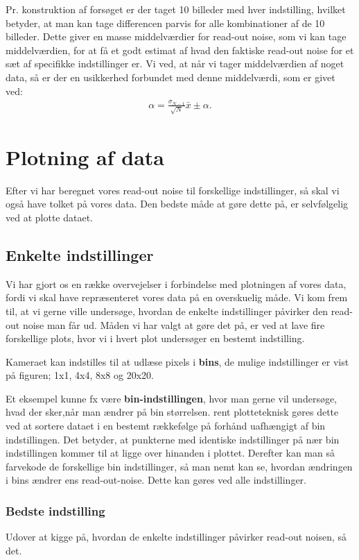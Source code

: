 \documentclass[working]{tuftebook}
\begin{document}
Pr. konstruktion af forsøget er der taget 10 billeder med hver indstilling, hvilket betyder, at man kan tage differencen parvis for alle kombinationer af de 10 billeder. Dette giver en masse middelværdier for read-out noise, som vi kan tage middelværdien, for at få et godt estimat af hvad den faktiske read-out noise for et sæt af specifikke indstillinger er. Vi ved, at når vi tager middelværdien af noget data, så er der en usikkerhed forbundet med denne middelværdi, som er givet ved:
\begin{align*}
\alpha = \frac{\sigma_{N-1}}{\sqrt{N}}
\bar{x}\pm \alpha
.\end{align*}
\section{Plotning af data}
Efter vi har beregnet vores read-out noise til forskellige indstillinger, så skal vi også have tolket på vores data. Den bedste måde at gøre dette på, er selvfølgelig ved at plotte dataet. 
\\
\subsection{Enkelte indstillinger}
Vi har gjort os en række overvejelser i forbindelse med plotningen af vores data, fordi vi skal have repræsenteret vores data på en overskuelig måde. Vi kom frem til, at vi gerne ville undersøge, hvordan de enkelte indstillinger påvirker den read-out noise man får ud. Måden vi har valgt at gøre det på, er ved at lave fire forskellige plots, hvor vi i hvert plot undersøger en bestemt indstilling. 
\\
\begin{marginfigure}[-100pt]
    \centering
    \caption{Kameraet kan indstilles til at udlæse pixels i \textbf{bins}, de mulige indstillinger er vist på figuren; 1x1, 4x4, 8x8 og 20x20. }
    \label{fig:bins}
\end{marginfigure}
Et eksempel kunne fx være \textbf{bin-indstillingen}, hvor man gerne vil undersøge, hvad der sker,når man ændrer på bin størrelsen. rent plotteteknisk gøres dette ved at sortere dataet i en bestemt rækkefølge på forhånd uafhængigt af bin indstillingen. Det betyder, at punkterne med identiske indstillinger på nær bin indstillingen kommer til at ligge over hinanden i plottet. Derefter kan man så farvekode de forskellige bin indstillinger, så man nemt kan se, hvordan ændringen i bins ændrer ens read-out-noise. Dette kan gøres ved alle indstillinger.
\subsubsection*{Bedste indstilling}
Udover at kigge på, hvordan de enkelte indstillinger påvirker read-out noisen, så det.
\end{document}
